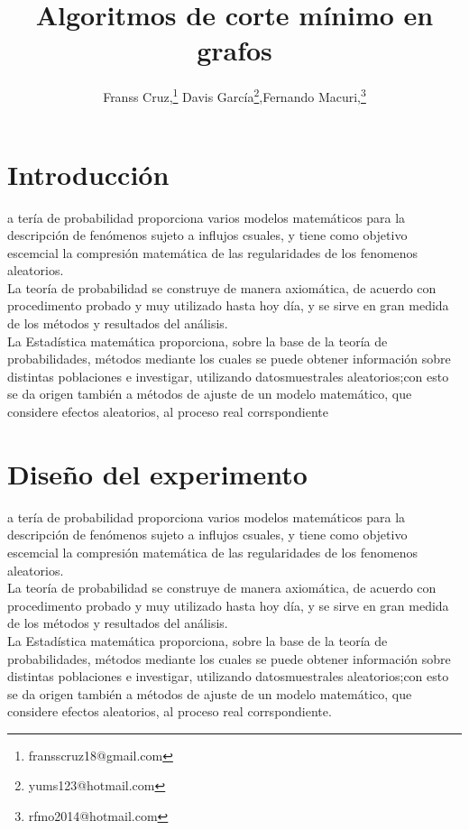 \documentclass[a4,papper]{IEEEtran}
\title{Algoritmos de corte mínimo en grafos}
\author{Franss Cruz,\thanks{fransscruz18@gmail.com}
Davis García\thanks{yums123@hotmail.com},Fernando Macuri,\thanks{rfmo2014@hotmail.com}}
\begin{document}
\maketitle
\section{Introducción}
a tería de probabilidad proporciona varios modelos matemáticos para la descripción de fenómenos sujeto a influjos csuales, y tiene como objetivo escemcial la compresión matemática de las regularidades de los fenomenos aleatorios.\\
La teoría de probabilidad se construye de manera axiomática, de acuerdo con procedimento probado y muy utilizado hasta hoy día, y se sirve en gran medida de los métodos y resultados del análisis.\\
La Estadística matemática proporciona, sobre la base de la teoría de probabilidades, métodos mediante los cuales se puede obtener información sobre distintas poblaciones e investigar, utilizando datosmuestrales aleatorios;con esto se da origen también a métodos de ajuste de un modelo matemático, que considere efectos aleatorios, al proceso real corrspondiente
\ \\[2pt]
\section{Diseño del experimento}
a tería de probabilidad proporciona varios modelos matemáticos para la descripción de fenómenos sujeto a influjos csuales, y tiene como objetivo escemcial la compresión matemática de las regularidades de los fenomenos aleatorios.\\
La teoría de probabilidad se construye de manera axiomática, de acuerdo con procedimento probado y muy utilizado hasta hoy día, y se sirve en gran medida de los métodos y resultados del análisis.\\
La Estadística matemática proporciona, sobre la base de la teoría de probabilidades, métodos mediante los cuales se puede obtener información sobre distintas poblaciones e investigar, utilizando datosmuestrales aleatorios;con esto se da origen también a métodos de ajuste de un modelo matemático, que considere efectos aleatorios, al proceso real corrspondiente.\\
\end{document}
